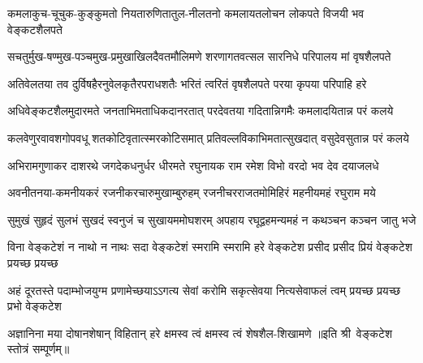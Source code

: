 
\twolineshloka
{कमलाकुच-चूचुक-कुङ्कुमतो नियतारुणितातुल-नीलतनो}
{कमलायतलोचन लोकपते विजयी भव वेङ्कटशैलपते}

\twolineshloka
{सचतुर्मुख-षण्मुख-पञ्चमुख-प्रमुखाखिलदैवतमौलिमणे}
{शरणागतवत्सल सारनिधे परिपालय मां वृषशैलपते}

\twolineshloka
{अतिवेलतया तव दुर्विषहैरनुवेलकृतैरपराधशतैः}
{भरितं त्वरितं वृषशैलपते परया कृपया परिपाहि हरे}

\twolineshloka
{अधिवेङ्कटशैलमुदारमते जनताभिमताधिकदानरतात्}
{परदेवतया गदितान्निगमैः कमलादयितान्न परं कलये}

\twolineshloka
{कलवेणुरवावशगोपवधू शतकोटिवृतात्स्मरकोटिसमात्}
{प्रतिवल्लविकाभिमतात्सुखदात् वसुदेवसुतान्न परं कलये}

\twolineshloka
{अभिरामगुणाकर दाशरथे जगदेकधनुर्धर धीरमते}
{रघुनायक राम रमेश विभो वरदो भव देव दयाजलधे}

\twolineshloka
{अवनीतनया-कमनीयकरं रजनीकरचारुमुखाम्बुरुहम्}
{रजनीचरराजतमोमिहिरं महनीयमहं रघुराम मये}

\twolineshloka
{सुमुखं सुहृदं सुलभं सुखदं स्वनुजं च सुखायममोघशरम्}
{अपहाय रघूद्वहमन्यमहं न कथञ्चन कञ्चन जातु भजे}

\fourlineindentedshloka
{विना वेङ्कटेशं न नाथो न नाथः}
{सदा वेङ्कटेशं स्मरामि स्मरामि}
{हरे वेङ्कटेश प्रसीद प्रसीद}
{प्रियं वेङ्कटेश प्रयच्छ प्रयच्छ}%

\fourlineindentedshloka
{अहं दूरतस्ते पदाम्भोजयुग्म}
{प्रणामेच्छयाऽऽगत्य सेवां करोमि}
{सकृत्सेवया नित्यसेवाफलं त्वम्}
{प्रयच्छ प्रयच्छ प्रभो वेङ्कटेश}

\twolineshloka
{अज्ञानिना मया दोषानशेषान् विहितान् हरे}
{क्षमस्व त्वं क्षमस्व त्वं शेषशैल-शिखामणे}
॥इति श्री~वेङ्कटेश स्तोत्रं सम्पूर्णम्॥
